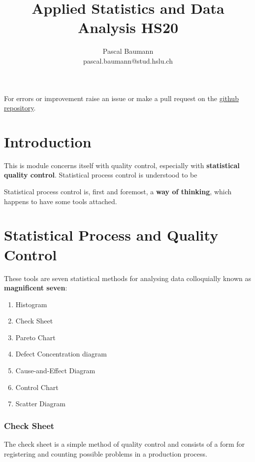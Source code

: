 \documentclass[11pt]{article}
\theoremstyle{definition}
\begin{document}
	
\title{Applied Statistics and Data Analysis HS20}
\author{Pascal Baumann\\pascal.baumann@stud.hslu.ch}
\maketitle



For errors or improvement raise an issue or make a pull request on the \href{https://github.com/KilnOfTheSecondFlame/mse_summaries}{github repository}.

\tableofcontents
\newpage

\section{Introduction}
This is module concerns itself with quality control, especially with \textbf{statistical quality control}. Statistical process control is understood to be

\begin{definition}
	Statistical process control is, first and foremost, a \textbf{way of thinking}, which happens to have some tools attached.
\end{definition}

\section{Statistical Process and Quality Control}
These tools are seven statistical methods for analysing data colloquially known as \textbf{magnificent seven}:
\begin{enumerate}[noitemsep]
	\item Histogram
	\item Check Sheet
	\item Pareto Chart
	\item Defect Concentration diagram
	\item Cause-and-Effect Diagram
	\item Control Chart
	\item Scatter Diagram
\end{enumerate}

\subsubsection{Check Sheet}
The check sheet is a simple method of quality control and consists of a form for  registering and counting possible problems in a production process.
\end{document}
